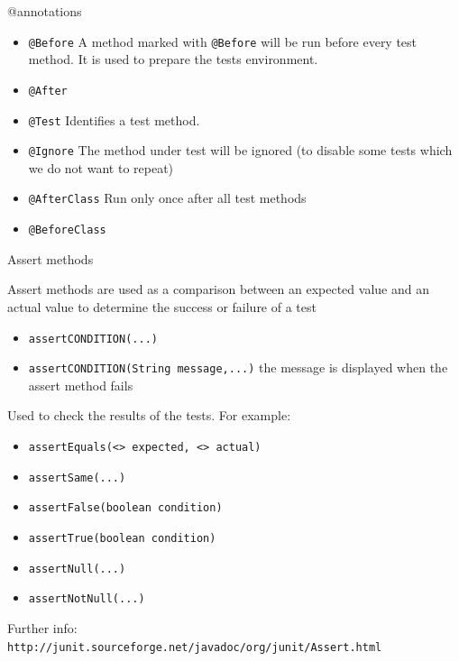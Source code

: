 \documentclass[11pt, xcolor=svgnames]{beamer}
\begin{document}

\begin{frame}{@annotations}

\begin{itemize}
  \item \texttt{@Before} A method marked with \texttt{@Before} will be run before every test method. It is used to prepare the tests environment.
  \item \texttt{@After}
  \item \texttt{@Test} Identifies a test method.
  \item \texttt{@Ignore} The method under test will be ignored (to disable some tests which we do not want to repeat)
  \item \texttt{@AfterClass} Run only once after all test methods
  \item \texttt{@BeforeClass}
  \end{itemize}
\end{frame}



\begin{frame}{Assert methods}


Assert methods are used as a comparison between an expected value and an actual value to determine the success or failure of a test

    \begin{itemize}
      \item \texttt{assertCONDITION(...)}
      \item \texttt{assertCONDITION(String message,...)}  the message is displayed when the assert method fails
    \end{itemize}

Used to check the results of the tests. For example:
    \begin{itemize}
      \item \texttt{assertEquals(<> expected, <> actual)}
      \item \texttt{assertSame(...)} 
      \item \texttt{assertFalse(boolean condition)}
      \item \texttt{assertTrue(boolean condition)}
      \item \texttt{assertNull(...)}
      \item \texttt{assertNotNull(...)}

    \end{itemize}
    Further info:\\
    \texttt{http://junit.sourceforge.net/javadoc/org/junit/Assert.html}

\end{frame}
\end{document}
